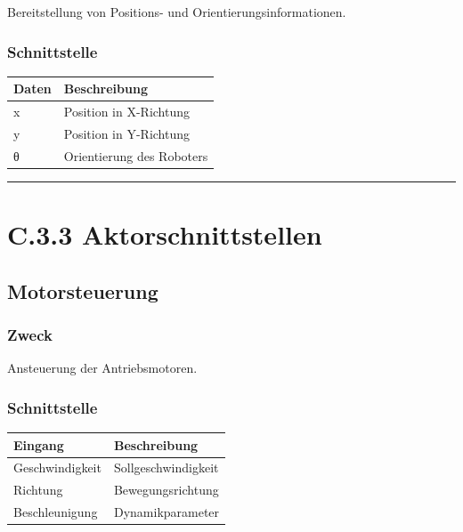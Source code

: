 \documentclass[
]{article}
\begin{document}
Bereitstellung von Positions- und Orientierungsinformationen.

\subsubsection{Schnittstelle}\label{schnittstelle-2}

\begin{longtable}[]{@{}ll@{}}
\toprule\noalign{}
Daten & Beschreibung \\
\midrule\noalign{}
\endhead
\bottomrule\noalign{}
\endlastfoot
x & Position in X-Richtung \\
y & Position in Y-Richtung \\
θ & Orientierung des Roboters \\
\end{longtable}

\begin{center}\rule{0.5\linewidth}{0.5pt}\end{center}

\section{C.3.3 Aktorschnittstellen}\label{c.3.3-aktorschnittstellen}

\subsection{Motorsteuerung}\label{motorsteuerung}

\subsubsection{Zweck}\label{zweck-3}

Ansteuerung der Antriebsmotoren.

\subsubsection{Schnittstelle}\label{schnittstelle-3}

\begin{longtable}[]{@{}ll@{}}
\toprule\noalign{}
Eingang & Beschreibung \\
\midrule\noalign{}
\endhead
\bottomrule\noalign{}
\endlastfoot
Geschwindigkeit & Sollgeschwindigkeit \\
Richtung & Bewegungsrichtung \\
Beschleunigung & Dynamikparameter \\
\end{longtable}
\end{document}
